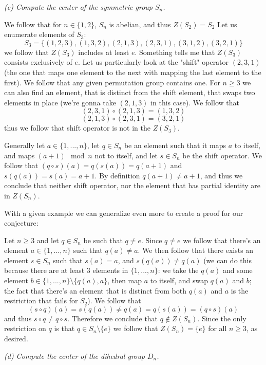 \documentclass[11pt,oneside,titlepage]{book}
\newcommand{\set}[1]{\{ #1 \}}
\begin{document}
\textit{(c) Compute the center of the symmetric group $S_n$.}

We follow that for $n \in \set{1, 2}$, $S_n$ is abelian, and thus
$Z(S_2) = S_2$
Let us enumerate elements of $S_3$:
$$S_3 = \set{(1, 2, 3), (1, 3, 2), (2, 1, 3),
  (2, 3, 1), (3, 1, 2), (3, 2, 1) } $$
we follow that $Z(S_3)$ includes at least $e$. Something tells me that
$Z(S_3)$ consists exclusively of $e$. Let us particularly look at the
"shift" operator $(2, 3, 1)$ (the one that maps one element to the
next with mapping the last element to the first). We follow that any
given permutation group contains one. For $n \geq 3$ we can also find
an element, that is distinct from the shift element, that swaps two
elements in place (we're gonna take $(2, 1, 3)$ in this case). We
follow that
$$(2, 3, 1) \circ (2, 1, 3) = (1, 3, 2)$$
$$(2, 1, 3) \circ (2, 3, 1) = (3, 2, 1)$$
thus we follow that shift operator is not in the $Z(S_3)$.

Generally let $a \in \set{1, ..., n}$, let $q \in S_n$ be an element
such that it maps $a$ to itself, and maps $(a + 1) \mod n$ not to
itself, and let $s \in S_n$ be the shift operator. We follow that $(q
\circ s) (a) = q(s(a)) = q(a + 1)$ and $s(q(a)) = s(a) = a + 1$. By
definition $q(a + 1) \neq a + 1$, and thus we conclude that neither
shift operator, nor the element that has partial identity are in
$Z(S_n)$.

With a given example we can generalize even more to create a proof
for our conjecture:

Let $n \geq 3$ and let $q \in S_n$ be such that $q \neq e$. Since $q
\neq e$ we follow that there's an element $a \in \set{1, ..., n}$ such
that $q(a) \neq a$. We then follow that there exists an element $s \in
S_n$ such that $s(a) = a$, and $s(q(a)) \neq q(a)$ (we can do this
because there are at least 3 elements in $\set{1, ..., n}$: we take
the $q(a)$ and some element $b \in \set{1, ..., n} \setminus
\set{q(a), a}$, then map $a$ to itself, and swap $q(a)$ and $b$; the
fact that there's an element that is distinct from both $q(a)$ and $a$
is the restriction that fails for $S_2$). We follow that
$$(s \circ q) (a) = s(q(a)) \neq q(a) = q(s(a)) = (q \circ s) (a)$$
and thus $s \circ q \neq q \circ s$.  Therefore we conclude that $q
\notin Z(S_n)$. Since the only restriction on $q$ is that $q \in S_n
\setminus \set{e}$ we follow that $Z(S_n) = \set{e}$ for all $n \geq
3$, as desired.

\textit{(d) Compute the center of the dihedral group $D_n$.}
\end{document}
